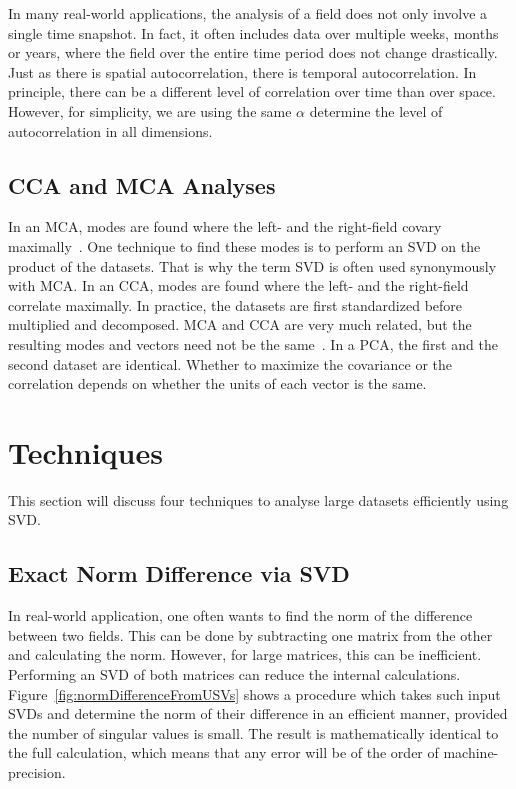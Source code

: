 \documentclass{acm_proc_article-sp}
\begin{document}
In many real-world applications, the analysis of a field does not only involve a single time snapshot. In fact, it often includes data over multiple weeks, months or years, where the field over the entire time period does not change drastically. Just as there is spatial autocorrelation, there is temporal autocorrelation. In principle, there can be a different level of correlation over time than over space. However, for simplicity, we are using the same $\alpha$ determine the level of autocorrelation in all dimensions.

\subsection{CCA and MCA Analyses}
\label{sec:Introduction CCA and MCA Analyses}

In an MCA, modes are found where the left- and the right-field covary maximally~\cite{Bretherton1992}. One technique to find these modes is to perform an SVD on the product of the datasets. That is why the term SVD is often used synonymously with MCA.
In an CCA, modes are found where the left- and the right-field correlate maximally. In practice, the datasets are first standardized before multiplied and decomposed. MCA and CCA are very much related, but the resulting modes and vectors need not be the same~\cite{Bretherton1992}.
In a PCA, the first and the second dataset are identical. Whether to maximize the covariance or the correlation depends on whether the units of each vector is the same.

\section{Techniques}
\label{Techniques}

This section will discuss four techniques to analyse large datasets efficiently using SVD.

\subsection{Exact Norm Difference via SVD}
\label{sec:Techniques Exact Norm Difference via SVD}

In real-world application, one often wants to find the norm of the difference between two fields. This can be done by subtracting one matrix from the other and calculating the norm. However, for large matrices, this can be inefficient. Performing an SVD of both matrices can reduce the internal calculations. Figure~\ref{fig:normDifferenceFromUSVs} shows a procedure which takes such input SVDs and determine the norm of their difference in an efficient manner, provided the number of singular values is small. The result is mathematically identical to the full calculation, which means that any error will be of the order of machine-precision.
\end{document}
